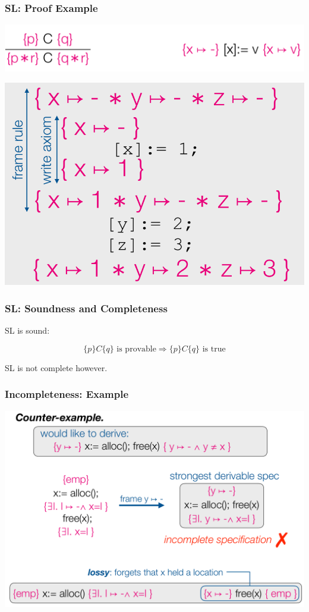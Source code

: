 \documentclass[11pt]{beamer}
\begin{document}
\begin{frame}\frametitle{SL: Proof Example}
\begin{center}
\includegraphics[scale=0.2]{rulesForExp.png}

\includegraphics[scale=0.2]{proofExp.png}
\end{center}
\end{frame}

\begin{frame}\frametitle{SL: Soundness and Completeness}

\begin{theorem}[Soundness]
SL is sound:

\[\{p\}C\{q\} \text{ is provable} \Rightarrow \{p\}C\{q\} \text{ is true}\]
\end{theorem}

SL is not complete however.
\end{frame}


\begin{frame}\frametitle{Incompleteness: Example}
\begin{center}
\includegraphics[scale=0.2]{incomplete.png}
\end{center}
\end{frame}
\end{document}

